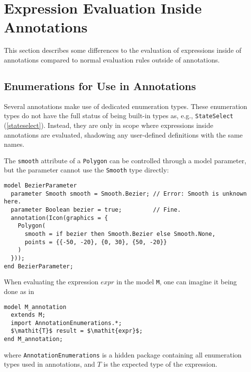 \section{Expression Evaluation Inside Annotations}\label{expression-evaluation-inside-annotations}

This section describes some differences to the evaluation of expressions inside of annotations compared to normal evaluation rules outside of annotations.


\subsection{Enumerations for Use in Annotations}\label{enumerations-for-use-in-annotations}

Several annotations make use of dedicated enumeration types.
These enumeration types do not have the full status of being built-in types as, e.g., \lstinline!StateSelect! (\cref{stateselect}).
Instead, they are only in scope where expressions inside annotations are evaluated, shadowing any user-defined definitions with the same names.

\begin{example}
The \lstinline!smooth! attribute of a \lstinline!Polygon! can be controlled through a model parameter, but the parameter cannot use the \lstinline!Smooth! type directly:
\begin{lstlisting}[language=modelica]
model BezierParameter
  parameter Smooth smooth = Smooth.Bezier; // Error: Smooth is unknown here.
  parameter Boolean bezier = true;         // Fine.
  annotation(Icon(graphics = {
    Polygon(
      smooth = if bezier then Smooth.Bezier else Smooth.None,
      points = {{-50, -20}, {0, 30}, {50, -20}}
    )
  }));
end BezierParameter;
\end{lstlisting}
\end{example}

\begin{nonnormative}
When evaluating the expression $\mathit{expr}$ in the model \lstinline!M!, one can imagine it being done as in
\begin{lstlisting}[language=modelica]
model M_annotation
  extends M;
  import AnnotationEnumerations.*;
  $\mathit{T}$ result = $\mathit{expr}$;
end M_annotation;
\end{lstlisting}
where \lstinline!AnnotationEnumerations! is a hidden package containing all enumeration types used in annotations, and $\mathit{T}$ is the expected type of the expression.
\end{nonnormative}



